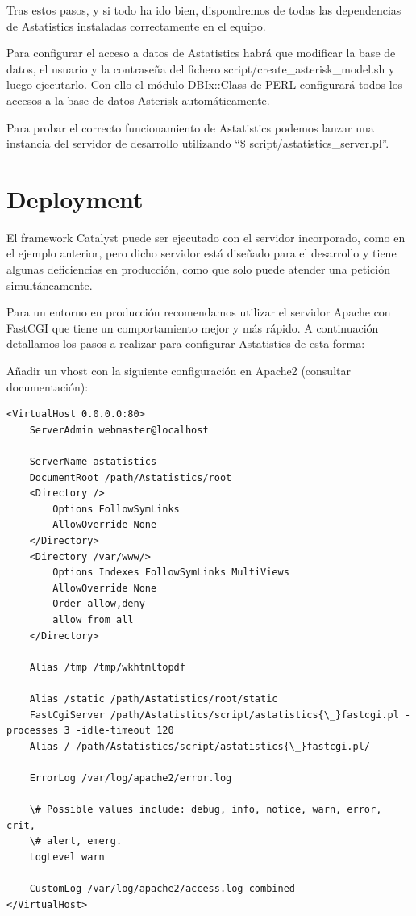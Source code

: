 \documentclass[spanish,12pt]{book}
\begin{document}
Tras estos pasos, y si todo ha ido bien, dispondremos de todas las dependencias de Astatistics instaladas correctamente en el equipo.

Para configurar el acceso a datos de Astatistics habrá que modificar la base de datos, el usuario y la contraseña del fichero script/create\_asterisk\_model.sh y luego ejecutarlo. Con ello el módulo DBIx::Class de PERL configurará todos los accesos a la base de datos Asterisk automáticamente.

Para probar el correcto funcionamiento de Astatistics podemos lanzar una instancia del servidor de desarrollo utilizando ``\$ script/astatistics\_server.pl''.

\section{Deployment}
El framework Catalyst puede ser ejecutado con el servidor incorporado, como en el ejemplo anterior, pero dicho servidor está diseñado para el desarrollo y tiene algunas deficiencias en producción, como que solo puede atender una petición simultáneamente.

Para un entorno en producción recomendamos utilizar el servidor Apache con FastCGI que tiene un comportamiento mejor y más rápido. A continuación detallamos los pasos a realizar para configurar Astatistics de esta forma:

Añadir un vhost con la siguiente configuración en Apache2 (consultar documentación):

\begin{lstlisting}
<VirtualHost 0.0.0.0:80>
	ServerAdmin webmaster@localhost
	
	ServerName astatistics
	DocumentRoot /path/Astatistics/root
	<Directory />
		Options FollowSymLinks
		AllowOverride None
	</Directory>
	<Directory /var/www/>
		Options Indexes FollowSymLinks MultiViews
		AllowOverride None
		Order allow,deny
		allow from all
	</Directory>

	Alias /tmp /tmp/wkhtmltopdf

	Alias /static /path/Astatistics/root/static
	FastCgiServer /path/Astatistics/script/astatistics{\_}fastcgi.pl -processes 3 -idle-timeout 120
	Alias /	/path/Astatistics/script/astatistics{\_}fastcgi.pl/

	ErrorLog /var/log/apache2/error.log

	\# Possible values include: debug, info, notice, warn, error, crit,
	\# alert, emerg.
	LogLevel warn

	CustomLog /var/log/apache2/access.log combined
</VirtualHost>
\end{lstlisting}
\end{document}
